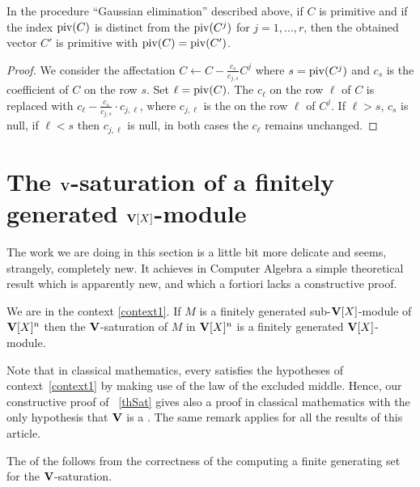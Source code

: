 \begin{lemma} \label{lemPivG}
In the procedure ``Gaussian elimination'' described above, if $C$ is primitive and if the index $\mathrm{piv}(C)$ is distinct from the  $\mathrm{piv}(C^j)$
for $j=1,\dots,r$, then the obtained vector $C'$ is primitive with $\mathrm{piv}(C)=\mathrm{piv}(C')$.
\end{lemma}
%
\begin{proof}{}
We consider the affectation $C\leftarrow C- \frac{c_s}{c_{j,s}} C^j$ where $s=\mathrm{piv}(C^j)$
and $c_s$ is the coefficient of $C$ on the row $s$.
Set $\ell=\mathrm{piv}(C)$. The \coe $c_\ell$ on the row $\ell$ of $C$ is  replaced with  $c_\ell - \frac{c_s}{c_{j,s}}\cdot c_{j,\ell}$, where $c_{j,\ell}$ is the \coe  on the row $\ell $ of $C^j$.
If $\ell >s$, $c_s$
is \rdt null, if $\ell <s$ then $c_{j,\ell}$ is \rdt null, in both cases the \coe $c_\ell$ remains \rdt
unchanged.
\end{proof}
%


\section{The $\mathbf{V}$-saturation of a finitely generated  $\mathbf{V}[X]$-module} \label{satVXmotf}

The work we are doing  in this section is a little bit more delicate and seems, strangely, completely new.
It  achieves in Computer Algebra a simple theoretical result which is apparently new, and which  a fortiori lacks a constructive proof.

\begin{theorem} \label{thSat} We are in the context \ref{context1}.
If $M$ is a finitely generated sub-$\mathbf{V}[X]$-module of $\mathbf{V}[X]^n$ then the $\mathbf{V}$-saturation of
$M$ in  $\mathbf{V}[X]^n$ is a finitely generated  $\mathbf{V}[X]$-module.
\end{theorem}

 Note that in classical mathematics, every \ddv satisfies the hypotheses of context~\ref{context1} by making use of the law of the excluded middle.
Hence, our constructive proof of \tho~\ref{thSat}  gives also a proof in
classical mathematics with the only hypothesis that $\mathbf{V}$
is a \ddv. The same remark applies for all the results of this  article.

\medskip The \dem of the \tho follows from the correctness
of the \algo computing  a finite generating set for the $\mathbf{V}$-saturation.


